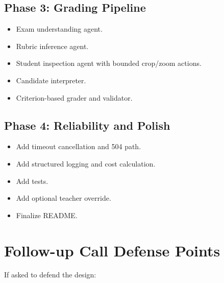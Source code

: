 \documentclass[11pt,a4paper]{article}
\begin{document}
\subsection{Phase 3: Grading Pipeline}

\begin{itemize}[leftmargin=*]
  \item Exam understanding agent.
  \item Rubric inference agent.
  \item Student inspection agent with bounded crop/zoom actions.
  \item Candidate interpreter.
  \item Criterion-based grader and validator.
\end{itemize}

\subsection{Phase 4: Reliability and Polish}

\begin{itemize}[leftmargin=*]
  \item Add timeout cancellation and 504 path.
  \item Add structured logging and cost calculation.
  \item Add tests.
  \item Add optional teacher override.
  \item Finalize README.
\end{itemize}

\section{Follow-up Call Defense Points}

If asked to defend the design:
\end{document}
